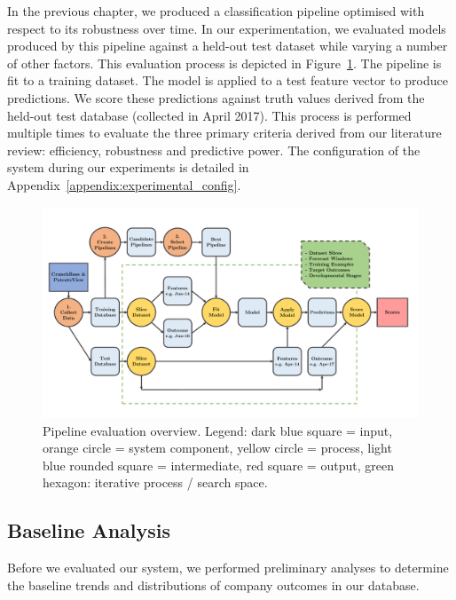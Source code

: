 \documentclass[../thesis/thesis.tex]{subfiles}
\begin{document}
In the previous chapter, we produced a classification pipeline optimised with respect to its robustness over time. In our experimentation, we evaluated models produced by this pipeline against a held-out test dataset while varying a number of other factors. This evaluation process is depicted in Figure~\ref{fig:evaluation:pipeline_evaluation}. The pipeline is fit to a training dataset. The model is applied to a test feature vector to produce predictions. We score these predictions against truth values derived from the held-out test database (collected in April 2017). This process is performed multiple times to evaluate the three primary criteria derived from our literature review: efficiency, robustness and predictive power. The configuration of the system during our experiments is detailed in Appendix~\ref{appendix:experimental_config}.

\begin{figure}[!htb]
    \centering
    \includegraphics[width=\textwidth]{../figures/evaluation/flowchart_evaluation}
    \caption[Pipeline evaluation flowchart]{Pipeline evaluation overview. Legend: dark blue square = input, orange circle = system component, yellow circle = process, light blue rounded square = intermediate, red square = output, green hexagon: iterative process / search space.}
    \label{fig:evaluation:pipeline_evaluation}
\end{figure}

\subsection{Baseline Analysis}

Before we evaluated our system, we performed preliminary analyses to determine the baseline trends and distributions of company outcomes in our database.
\end{document}
